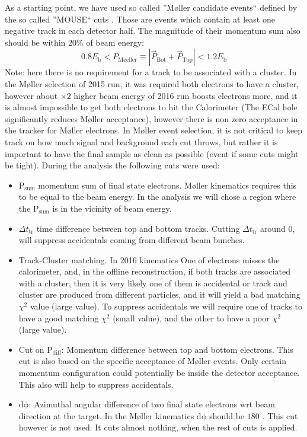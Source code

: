 \documentclass[letterpaper,12pt]{article}
\def \Mlr {M\o ller }
\begin{document}
As a starting point, we have used so called ''\Mlr candidate events`` defined by the so called ''MOUSE`` cuts \cite{MOUSE_Cuts}. Those are events which contain at least one negative track in each detector half. The magnitude of their momentum sum also should be within $\mathrm{20\%}$ of beam energy:
\begin{equation}
 0.8E_{\mathrm{b}} < P_{\mathrm{M\text{\o} eller}} \equiv |\vec{P}_{\mathrm{Bot}} + \vec{P}_{\mathrm{Top}}| < 1.2E_{\mathrm{b}}
\end{equation}
Note: here there is no requirement for a track to be associated with a cluster. In the \Mlr selection of 2015 run, it was required both electrons to have a cluster, however about $\times 2$ higher beam energy of 2016 run boosts electrons more, and it is almost impossible to get both electrons to hit the Calorimeter (The ECal hole significantly reduces \Mlr acceptance), however there is non zero acceptance in the tracker for \Mlr electrons.
In \Mlr event selection, it is not critical to keep track on how much signal and background each cut throws, but rather it is important to have the final sample as clean as possible (event if some cuts might be tight). During the analysis the following cuts were used:
\begin{itemize}
 \item $\mathrm{P_{sum}}$ momentum sum of final state electrons. \Mlr kinematics requires this to be equal to the beam energy. In the analysis we will chose a region where the  $\mathrm{P_{sum}}$ is in the vicinity of beam energy.
 \item $\Delta t_{\mathrm{tr}}$ time difference between top and bottom tracks. Cutting $\Delta t_{\mathrm{tr}}$ around 0, will suppress accidentals coming from different beam bunches.
 \item Track-Cluster matching. In 2016 kinematics One of electrons misses the calorimeter, and, in the offline reconstruction, if both tracks are associated with a cluster, then it is very likely one of them is accidental or track and cluster are produced from different particles, and it will yield a bad matching $\chi^{2}$ value (large value). To suppress accidentals we will require one of tracks to have a good matching $\chi^{2}$ (small value), and the other to have a poor $\chi^{2}$ (large value).
 \item Cut on $\mathrm{P_{diff}}$: Momentum difference between top and bottom electrons.
 This cut is also based on the specific acceptance of \Mlr events. Only certain momentum configuration could potentially be inside the detector acceptance.
 This also will help to suppress accidentals.
 \item $\mathrm{d\phi}$: Azimuthal angular difference of two final state electrons wrt beam direction at the target. In the \Mlr kinematics $\mathrm{d\phi}$ should be $180^{\circ}$. This cut however is not used. It cuts almost nothing, when the rest of cuts is applied.
\end{itemize}
\end{document}
